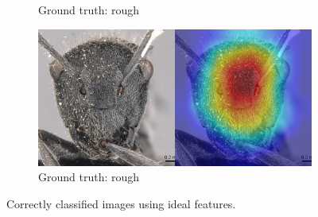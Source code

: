 \documentclass{aci}
\numberwithin{equation}{section}
\begin{document}
\begin{figure}
\begin{subfigure}{\subwidth}
        \caption{Ground truth: rough}
        \label{fig:correct_ideal_842}
    \end{subfigure}
    \begin{subfigure}{\subwidth}
        \includegraphics[width=1\linewidth]{thesis_assets/gradcam/correct_ideal/1091.png}
        \caption{Ground truth: rough}
        \label{fig:correct_ideal_1091}
    \end{subfigure}
    \caption{Correctly classified images using ideal features.}
    \label{fig:correct_ideal}
\end{figure}
\end{document}
